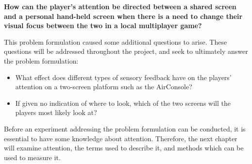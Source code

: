 \begin{changemargin}{1cm}{1cm}
\textbf{How can the player’s attention be directed between a shared screen and a personal hand-held screen when there is a need to change their visual focus between the two in a local multiplayer game?}
\end{changemargin}

This problem formulation caused some additional questions to arise. These questions will be addressed throughout the project, and seek to ultimately answer the problem formulation:
\begin{itemize}
\item What effect does different types of sensory feedback have on the players' attention on a two-screen platform such as the AirConsole?
\item If given no indication of where to look, which of the two screens will the players most likely look at?
\end{itemize}

Before an experiment addressing the problem formulation can be conducted, it is essential to have some knowledge about attention. Therefore, the next chapter will examine attention, the terms used to describe it, and methods which can be used to measure it.